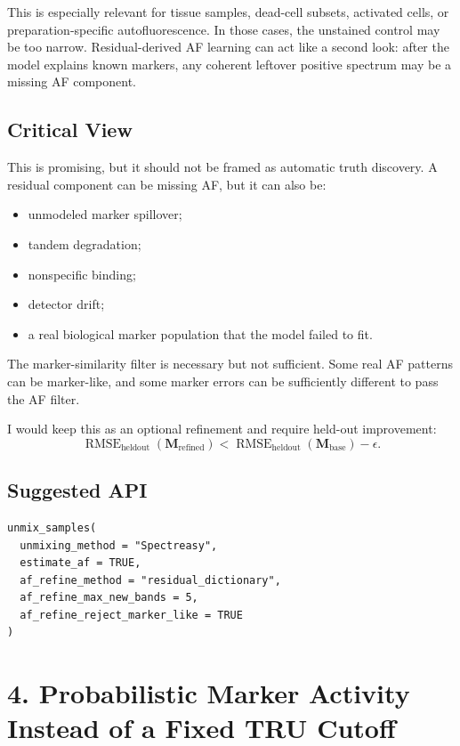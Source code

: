 \documentclass[11pt]{article}
\newcommand{\M}{\mathbf{M}}
\begin{document}
This is especially relevant for tissue samples, dead-cell subsets, activated
cells, or preparation-specific autofluorescence. In those cases, the unstained
control may be too narrow. Residual-derived AF learning can act like a second
look: after the model explains known markers, any coherent leftover positive
spectrum may be a missing AF component.

\subsection*{Critical View}

This is promising, but it should not be framed as automatic truth discovery. A
residual component can be missing AF, but it can also be:
\begin{itemize}
  \item unmodeled marker spillover;
  \item tandem degradation;
  \item nonspecific binding;
  \item detector drift;
  \item a real biological marker population that the model failed to fit.
\end{itemize}
The marker-similarity filter is necessary but not sufficient. Some real AF
patterns can be marker-like, and some marker errors can be sufficiently
different to pass the AF filter.

I would keep this as an optional refinement and require held-out improvement:
\begin{equation}
  \operatorname{RMSE}_{\text{heldout}}(\M_{\text{refined}})
  <
  \operatorname{RMSE}_{\text{heldout}}(\M_{\text{base}}) - \epsilon.
\end{equation}

\subsection*{Suggested API}

\begin{verbatim}
unmix_samples(
  unmixing_method = "Spectreasy",
  estimate_af = TRUE,
  af_refine_method = "residual_dictionary",
  af_refine_max_new_bands = 5,
  af_refine_reject_marker_like = TRUE
)
\end{verbatim}

\section{4. Probabilistic Marker Activity Instead of a Fixed TRU Cutoff}
\end{document}
